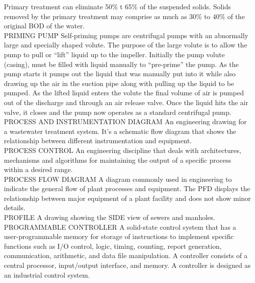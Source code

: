 Primary treatment can eliminate 50\% t 65\% of the suspended solids. Solids removed by the primary treatment may comprise as much as 30\% to 40\% of the original BOD of the water.
\vspace{0.3cm}\\
PRIMING PUMP
Self-priming pumps are centrifugal pumps with an abnormally large and specially shaped volute. The purpose of the large volute is to allow the pump to pull or “lift” liquid up to the impeller. Initially the pump volute (casing), must be filled with liquid manually to “pre-prime” the pump. As the pump starts it pumps out the liquid that was manually put into it while also drawing up the air in the suction pipe along with pulling up the liquid to be pumped. As the lifted liquid enters the volute the final volume of air is pumped out of the discharge and through an air release valve. Once the liquid hits the air valve, it closes and the pump now operates as a standard centrifugal pump.
\vspace{0.3cm}\\
PROCESS AND INSTRUMENTATION DIAGRAM
An engineering drawing for a wastewater treatment system. It’s a schematic flow diagram that shows the relationship between different instrumentation and equipment.
\vspace{0.3cm}\\
PROCESS CONTROL
An engineering discipline that deals with architectures, mechanisms and algorithms for maintaining the output of a specific process within a desired range.
\vspace{0.3cm}\\
PROCESS FLOW DIAGRAM
A diagram commonly used in engineering to indicate the general flow of plant processes and equipment. The PFD displays the relationship between major equipment of a plant facility and does not show minor details.
\vspace{0.3cm}\\
PROFILE
A drawing showing the SIDE view of sewers and manholes. 
\vspace{0.3cm}\\
PROGRAMMABLE CONTROLLER
A solid-state control system that has a user-programmable memory for storage of instructions to implement specific functions such as I/O control, logic, timing, counting, report generation, communication, arithmetic, and data file manipulation. A controller consists of a central processor, input/output interface, and memory. A controller is designed as an industrial control system.
\vspace{0.3cm}\\

